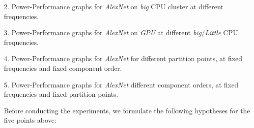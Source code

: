 \documentclass{uva-inf-article}
\begin{document}
2. Power-Performance graphs for {\em AlexNet} on {\em big} CPU cluster at different frequencies.

3. Power-Performance graphs for {\em AlexNet} on {\em GPU} at different {\em big}/{\em Little} CPU frequencies.

4. Power-Performance graphs for {\em AlexNet} for different partition points, at fixed frequencies and fixed component order.

5. Power-Performance graphs for {\em AlexNet} different component orders, at fixed frequencies and fixed partition points.

\par\vspace{\baselineskip}

Before conducting the experiments, we formulate the following hypotheses for the five points above:
\end{document}
